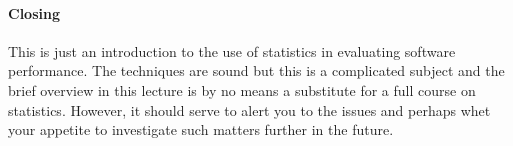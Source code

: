 \paragraph{Closing}
This is just an introduction to the use of statistics in evaluating
software performance. The techniques are sound but this is a complicated
subject and the brief overview in this lecture is by no means a substitute
for a full course on statistics. However, it should serve to alert you
to the issues and perhaps whet your appetite to investigate such matters
further in the future. 




